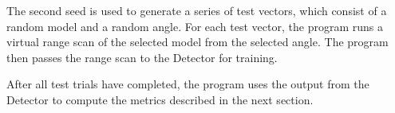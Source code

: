 The second seed is used to generate a series of test vectors, which consist of a random model and a random angle.
For each test vector, the program runs a virtual range scan of the selected model from the selected angle.
The program then passes the range scan to the Detector for training.

After all test trials have completed, the program uses the output from the Detector to compute the metrics described in the next section.

